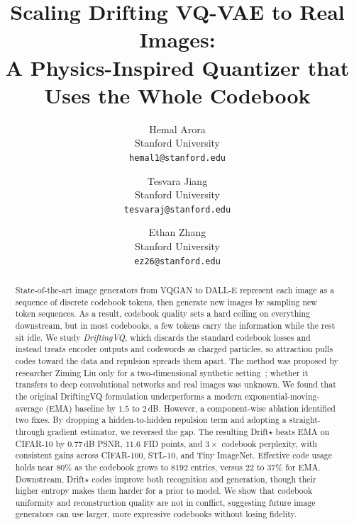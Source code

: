 \documentclass[10pt,twocolumn,letterpaper]{article}
\begin{document}
\title{Scaling Drifting VQ-VAE to Real Images:\\
A Physics-Inspired Quantizer that Uses the Whole Codebook}

\author{Hemal Arora\\
Stanford University\\
{\tt\small hemal1@stanford.edu}
\and
Tesvara Jiang\\
Stanford University\\
{\tt\small tesvaraj@stanford.edu}
\and
Ethan Zhang\\
Stanford University\\
{\tt\small ez26@stanford.edu}
}

\maketitle

\begin{abstract}
State-of-the-art image generators from VQGAN to DALL-E represent each image as a sequence of discrete codebook tokens, then generate new images by sampling new token sequences. As a result, codebook quality sets a hard ceiling on everything downstream, but in most codebooks, a few tokens carry the information while the rest sit idle. We study \emph{DriftingVQ}, which discards the standard codebook losses and instead treats encoder outputs and codewords as charged particles, so attraction pulls codes toward the data and repulsion spreads them apart. The method was proposed by researcher Ziming Liu only for a two-dimensional synthetic setting~\cite{liu2026drift}; whether it transfers to deep convolutional networks and real images was unknown. We found that the original DriftingVQ formulation underperforms a modern exponential-moving-average (EMA) baseline by $1.5$ to $2$\,dB. However, a component-wise ablation identified two fixes. By dropping a hidden-to-hidden repulsion term and adopting a straight-through gradient estimator, we reversed the gap. The resulting Drift$\star$ beats EMA on CIFAR-10 by $0.77$\,dB PSNR, $11.6$ FID points, and $3{\times}$ codebook perplexity, with consistent gains across CIFAR-100, STL-10, and Tiny ImageNet. Effective code usage holds near $80\%$ as the codebook grows to $8192$ entries, versus $22$ to $37\%$ for EMA. Downstream, Drift$\star$ codes improve both recognition and generation, though their higher entropy makes them harder for a prior to model. We show that codebook uniformity and reconstruction quality are not in conflict, suggesting future image generators can use larger, more expressive codebooks without losing fidelity.
\end{abstract}
\end{document}
